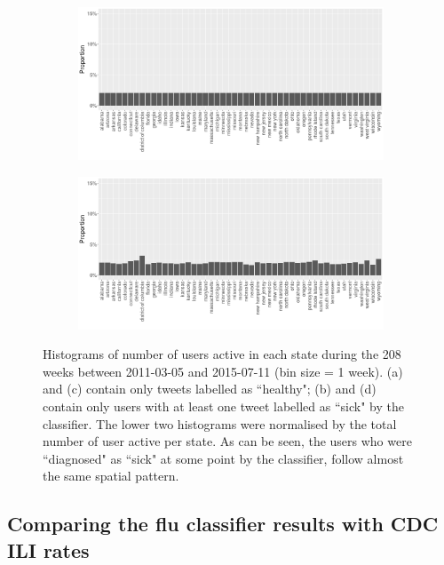 \documentclass[11pt, a4paper,twoside]{report}\usepackage[]{graphicx}\usepackage[]{color}
\begin{document}
\begin{figure}[H]
    \begin{subfigure}[t]{0.49\textwidth}
  \includegraphics[width=1\linewidth]{activity_rel_healthy_user_statename_Twitter_full_aggregated.png}
  \caption{}
  \end{subfigure}
  \hfill
    \begin{subfigure}[t]{0.49\textwidth}
  \includegraphics[width=1\linewidth]{activity_rel_sick_user_statename_Twitter_full_aggregated.png}
  \caption{}
  \end{subfigure}
  \caption{Histograms of number of users active in each state during the 208 weeks between 2011-03-05 and 2015-07-11 (bin size = 1 week). (a) and (c) contain only tweets labelled as ``healthy"; (b) and (d) contain only users with at least one tweet labelled as ``sick" by the classifier. The lower two histograms were normalised by the total number of user active per state. As can be seen, the users who were ``diagnosed" as ``sick" at some point by the classifier, follow almost the same spatial pattern.}
  \label{fig:tweets_state_healthy_sick_user}
\end{figure}

\subsection{Comparing the flu classifier results with CDC ILI rates}
\label{sec:comp_cdc}
\end{document}
